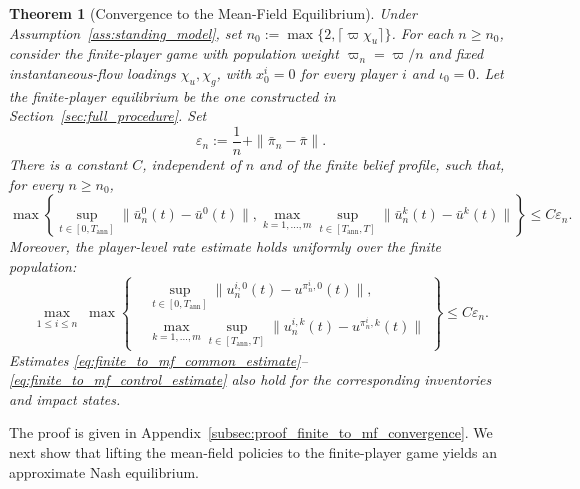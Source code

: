 \documentclass[12pt]{article}
\numberwithin{equation}{section}
\newtheorem{theorem}{Theorem}[section]
\theoremstyle{definition}
\begin{document}
\begin{theorem}[Convergence to the Mean-Field Equilibrium]
\label{thm:finite_to_mf_convergence}
Under Assumption~\ref{ass:standing_model}, set
\(n_0:=\max\{2,\lceil\varpi\chi_u\rceil\}\). For each \(n\ge n_0\), consider the
finite-player game with population weight
\(\varpi_n=\varpi/n\) and
fixed instantaneous-flow loadings \(\chi_u,\chi_g\),
with \(x_0^i=0\) for every player \(i\) and \(\iota_0=0\). Let the
finite-player equilibrium be the one constructed in
Section~\ref{sec:full_procedure}. Set
\[
\varepsilon_n:=\frac1n+\|\bar\pi_n-\bar\pi\|.
\]
There is a
constant \(C\), independent of \(n\) and of the finite belief profile, such
that, for every \(n\ge n_0\),
\begin{equation}\label{eq:finite_to_mf_common_estimate}
\max\left\{
\sup_{t\in[0,T_{\mathrm{ann}}]}
\|\bar u_n^{0}(t)-\bar u^0(t)\|,
\max_{k=1,\ldots,m}\sup_{t\in[T_{\mathrm{ann}},T]}
\|\bar u_n^{k}(t)-\bar u^k(t)\|
\right\}
\le
C\varepsilon_n.
\end{equation}
Moreover, the player-level rate estimate holds uniformly over the finite
population:
\begin{equation}\label{eq:finite_to_mf_control_estimate}
\max_{1\le i\le n}\;
\max\left\{
\begin{aligned}
&\sup_{t\in[0,T_{\mathrm{ann}}]}
\|u_n^{i,0}(t)-u^{\pi_n^i,0}(t)\|,\\
&\max_{k=1,\ldots,m}\sup_{t\in[T_{\mathrm{ann}},T]}
\|u_n^{i,k}(t)-u^{\pi_n^i,k}(t)\|
\end{aligned}
\right\}
\le
C\varepsilon_n.
\end{equation}
Estimates \eqref{eq:finite_to_mf_common_estimate}--\eqref{eq:finite_to_mf_control_estimate}
also hold for the corresponding inventories and impact states.
\end{theorem}

The proof is given in
Appendix~\ref{subsec:proof_finite_to_mf_convergence}.
We next show that lifting the mean-field policies to the finite-player game
yields an approximate Nash equilibrium.
\end{document}
